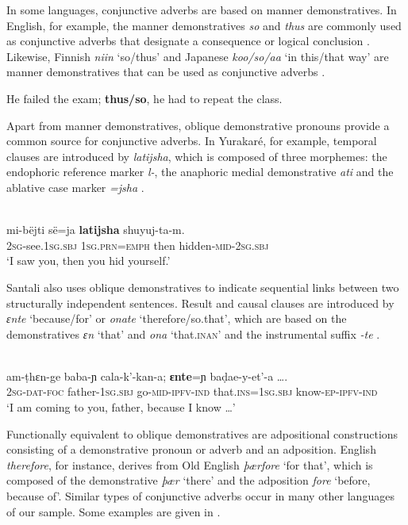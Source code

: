 \documentclass[output=paper,colorlinks,citecolor=brown]{langscibook}
\begin{document}
In some languages, conjunctive adverbs are based on manner demonstratives. In English, for example, the manner demonstratives \textit{so} and \textit{thus} are commonly used as conjunctive adverbs that designate a consequence or logical conclusion . Likewise, Finnish \textit{niin} ‘so/thus’ and Japanese \textit{koo/so/aa} ‘in this/that way’ are manner demonstratives that can be used as conjunctive adverbs \citep{König2012}.

\ea\label{ex:diessel:25}
{He failed the exam; \textbf{thus/so}, he had to repeat the class.}\\
\z

Apart from manner demonstratives, oblique demonstrative pronouns provide a common source for conjunctive adverbs. In Yurakaré, for example, temporal clauses are introduced by \textit{latijsha}, which is composed of three morphemes: the endophoric reference marker \textit{l-}, the anaphoric medial demonstrative \textit{ati} and the ablative case marker \textit{=jsha} .

\ea\label{ex:diessel:26}
\\
\gll mi-bëjti    së=ja       \textbf{latijsha}   shuyuj-ta-m.\\
     \textsc{2sg-}see\textsc{.1sg.sbj}  \textsc{1sg.prn=emph}  then    hidden\textsc{-mid-2sg.sbj}\\
\glt ‘I saw you, then you hid yourself.’
\z

Santali also uses oblique demonstratives to indicate sequential links between two structurally independent sentences. Result and causal clauses are introduced by \textit{ɛnte} ‘because/for’ or \textit{onate} ‘therefore/so.that’, which are based on the demonstratives \textit{ɛn} ‘that’ and \textit{ona} ‘that.\textsc{inan}’ and the instrumental suffix \textit{-te} .

\ea\label{ex:diessel:27}
\\
\gll am-ṭhɛn-ge    baba-ɲ     cala-k’-kan-a; {\ob}\textbf{ɛnte}=ɲ    baḍae-y-et’-a …{\cb}.\\
     \textsc{2sg-dat-foc}    father-\textsc{1sg.sbj}   go-\textsc{mid-ipfv-ind}   {\db}that\textsc{.ins=1sg.sbj}   know-\textsc{ep-ipfv-ind} \\
\glt ‘I am coming to you, father, because I know …’
\z

Functionally equivalent to oblique demonstratives are adpositional constructions consisting of a demonstrative pronoun or adverb and an adposition. English \textit{therefore}, for instance, derives from Old English \textit{þærƒore} ‘for that’, which is composed of the demonstrative \textit{þær} ‘there’ and the adposition \textit{fore} ‘before, because of’. Similar types of conjunctive adverbs occur in many other languages of our sample. Some examples are given in .
\end{document}
